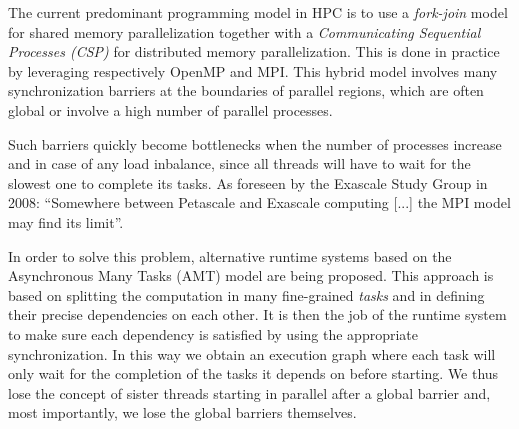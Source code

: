 The current predominant programming model in HPC is to use a \emph{fork-join} model for shared memory parallelization together with a \emph{Communicating Sequential Processes (CSP)}\cite{hoare1978communicating} for distributed memory parallelization. This is done in practice by leveraging respectively OpenMP and MPI.
This hybrid model involves many synchronization barriers at the boundaries of parallel regions, which are often global or involve a high number of parallel processes.

Such barriers quickly become bottlenecks when the number of processes increase and in case of any load inbalance, since all threads will have to wait for the slowest one to complete its tasks. As foreseen by the Exascale Study Group in 2008: ``Somewhere between Petascale and Exascale computing [...] the MPI model may find its limit''.\cite{bergman2008exascale}

In order to solve this problem, alternative runtime systems based on the Asynchronous Many Tasks (AMT) model are being proposed\cite{heller2017hpx}. This approach is based on splitting the computation in many fine-grained \emph{tasks} and in defining their precise dependencies on each other.
It is then the job of the runtime system to make sure each dependency is satisfied by using the appropriate synchronization.
In this way we obtain an execution graph where each task will only wait for the completion of the tasks it depends on before starting. We thus lose the concept of sister threads starting in parallel after a global barrier and, most importantly, we lose the global barriers themselves.

